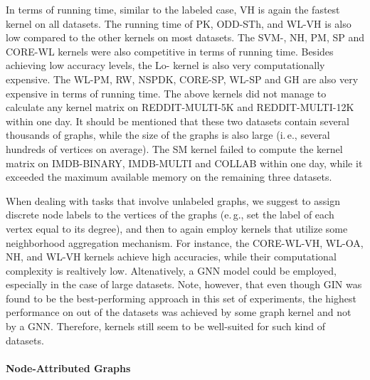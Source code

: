 \documentclass[twoside,11pt]{article}
\newcommand{\eg}{e.\,g., }
\newcommand{\ie}{i.\,e., }
\begin{document}
In terms of running time, similar to the labeled case, VH is again the fastest kernel on all datasets.
The running time of PK, ODD-STh, and WL-VH is also low compared to the other kernels on most datasets.
The SVM-, NH, PM, SP and CORE-WL kernels were also competitive in terms of running time.
Besides achieving low accuracy levels, the Lo- kernel is also very computationally expensive.
The WL-PM, RW, NSPDK, CORE-SP, WL-SP and GH are also very expensive in terms of running time.
The above  kernels did not manage to calculate any kernel matrix on REDDIT-MULTI-5K and REDDIT-MULTI-12K within one day.
It should be mentioned that these two datasets contain several thousands of graphs, while the size of the graphs is also large (\ie several hundreds of vertices on average).
The SM kernel failed to compute the kernel matrix on IMDB-BINARY, IMDB-MULTI and COLLAB within one day, while it exceeded the maximum available memory on the remaining three datasets.

When dealing with tasks that involve unlabeled graphs, we suggest to assign discrete node labels to the vertices of the graphs (\eg set the label of each vertex equal to its degree), and then to again employ kernels that utilize some neighborhood aggregation mechanism.
For instance, the CORE-WL-VH, WL-OA, NH, and WL-VH kernels achieve high accuracies, while their computational complexity is realtively low.
Altenatively, a GNN model could be employed, especially in the case of large datasets.
Note, however, that even though GIN was found to be the best-performing approach in this set of experiments, the highest performance on  out of the  datasets was achieved by some graph kernel and not by a GNN.
Therefore, kernels still seem to be well-suited for such kind of datasets.

\paragraph{Node-Attributed Graphs}
\end{document}
